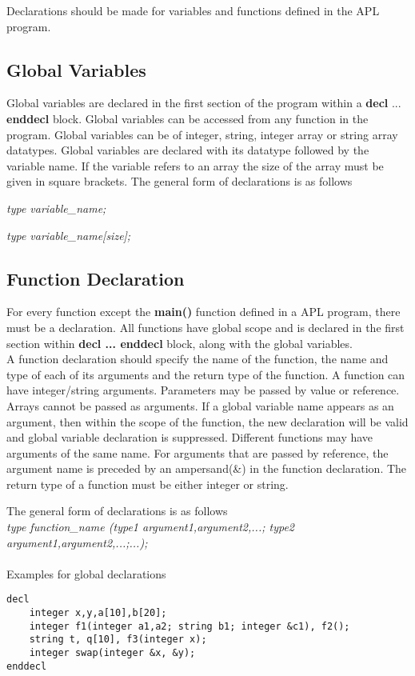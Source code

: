 \documentclass[11pt]{article}
\begin{document}
Declarations should be made for  variables and functions defined in the APL program.




\subsection{Global Variables}
 
Global variables are declared in the first section of the program within a \textbf{decl} ... \textbf{enddecl} block. Global variables can be accessed from any function in the program. Global variables can be of integer, string, integer array or string array datatypes. Global variables are declared with its datatype followed by the variable name. If the variable refers to an array the size of the array must be given in square brackets. The general form of declarations is as follows 

\textit{type variable\_name;} 

\textit{type variable\_name[size];}





\subsection{Function Declaration}
For every function except the \textbf{main()} function defined in a APL program, there must be a declaration. All functions have global scope and is declared in the first section within \textbf{decl ... enddecl} block, along with the global variables.\\

    A function declaration should specify the name of the function, the name and type of each of its arguments and the return type of the function. A function can have integer/string arguments. Parameters may be passed by value or reference. Arrays cannot be passed as arguments. If a global variable name appears as an argument, then within the scope of the function, the new declaration will be valid and global variable declaration is suppressed. Different functions may have arguments of the same name. For arguments that are passed by reference, the argument name is preceded by an ampersand(\&) in the function declaration. The return type of a function must be either integer or string. 


The general form of declarations is as follows \\ 

\textit{type function\_name (type1 argument1,argument2,...; type2 argument1,argument2,...;...);}
\\
\\
Examples for global declarations
\begin{lstlisting}
decl
	integer x,y,a[10],b[20];	
	integer f1(integer a1,a2; string b1; integer &c1), f2(); 
	string t, q[10], f3(integer x); 
	integer swap(integer &x, &y);	 
enddecl
\end{lstlisting}
\end{document}
